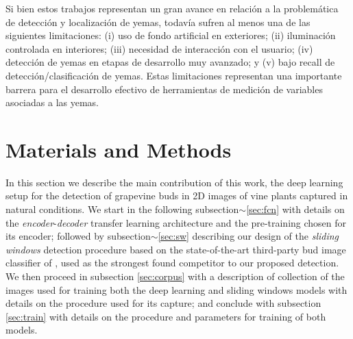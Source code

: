 \documentclass[a4paper,authoryear,review]{elsarticle}
\begin{document}
Si bien estos trabajos representan un gran avance en relación a la problemática de detección y localización de yemas, todavía sufren al menos una de las siguientes limitaciones: (i) uso de fondo artificial en exteriores; (ii) iluminación controlada en interiores; (iii) necesidad de interacción con el usuario; (iv) detección de yemas en etapas de desarrollo muy avanzado; y (v) bajo recall de detección/clasificación de yemas. Estas limitaciones representan una importante barrera para el desarrollo efectivo de herramientas de medición de variables asociadas a las yemas. 

\section{Materials and Methods}
\label{sec:matmet}

In this section we describe the main contribution of this work, the  deep learning setup for the detection of grapevine buds in 2D images of vine plants captured in natural conditions. We start in the following subsection$\sim$\ref{sec:fcn} with details on the \emph{encoder}-\emph{decoder} transfer learning architecture and the pre-training chosen for its encoder; followed by subsection$\sim$\ref{sec:sw} describing our design of the \emph{sliding windows} detection procedure based on the state-of-the-art third-party bud image classifier of \cite{perez2017image}, used as the strongest found competitor to our proposed detection. 
%
We then proceed in subsection \ref{sec:corpus} with a description of collection of the images used for training both the deep learning and sliding windows models with details on the procedure used for its capture; and conclude with subsection \ref{sec:train} with details on the procedure and parameters for training of both models.
\end{document}
